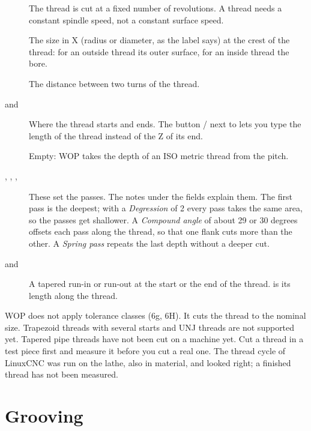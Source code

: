\begin{description}
\item[] The thread is cut at a fixed number of revolutions. A thread needs a constant spindle speed, not a constant surface speed.
\item[] The size in X (radius or diameter, as the label says) at the crest of the thread: for an outside thread its outer surface, for an inside thread the bore.
\item[] The distance between two turns of the thread.
\item[ and ] Where the thread starts and ends. The button  /  next to  lets you type the length of the thread instead of the Z of its end.
\item[] Empty: WOP takes the depth of an ISO metric thread from the pitch.
\item[, , , ] These set the passes. The notes under the fields explain them. The first pass is the deepest; with a \emph{Degression} of 2 every pass takes the same area, so the passes get shallower. A \emph{Compound angle} of about 29 or 30 degrees offsets each pass along the thread, so that one flank cuts more than the other. A \emph{Spring pass} repeats the last depth without a deeper cut.
\item[ and ] A tapered run-in or run-out at the start or the end of the thread.  is its length along the thread.
\end{description}

\begin{notebox}
WOP does not apply tolerance classes (6g, 6H). It cuts the thread to the nominal size. Trapezoid threads with several starts and UNJ threads are not supported yet. Tapered pipe threads have not been cut on a machine yet. Cut a thread in a test piece first and measure it before you cut a real one. The thread cycle of LinuxCNC was run on the lathe, also in material, and looked right; a finished thread has not been measured.
\end{notebox}

\section{Grooving}\label{sec:blocks:grooving}


